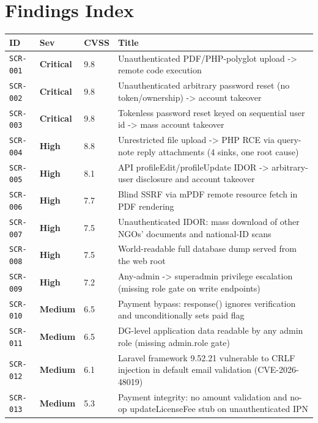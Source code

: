 \documentclass[11pt,a4paper]{article}
\newcommand{\sevbadge}[1]{\textbf{\textcolor{sev#1}{#1}}}
\begin{document}
\section*{Findings Index}
{\renewcommand{\arraystretch}{1.25}%
\begin{longtable}{@{}l l l >{\raggedright\arraybackslash}p{}@{}}
\toprule \textbf{ID} & \textbf{Sev} & \textbf{CVSS} & \textbf{Title}\\\midrule\endhead
\texttt{SCR-001} & \sevbadge{Critical} & 9.8 & Unauthenticated PDF/PHP-polyglot upload -\textgreater{} remote code execution\\
\texttt{SCR-002} & \sevbadge{Critical} & 9.8 & Unauthenticated arbitrary password reset (no token/ownership) -\textgreater{} account takeover\\
\texttt{SCR-003} & \sevbadge{Critical} & 9.8 & Tokenless password reset keyed on sequential user id -\textgreater{} mass account takeover\\
\texttt{SCR-004} & \sevbadge{High} & 8.8 & Unrestricted file upload -\textgreater{} PHP RCE via query-note reply attachments (4 sinks, one root cause)\\
\texttt{SCR-005} & \sevbadge{High} & 8.1 & API profileEdit/profileUpdate IDOR -\textgreater{} arbitrary-user disclosure and account takeover\\
\texttt{SCR-006} & \sevbadge{High} & 7.7 & Blind SSRF via mPDF remote resource fetch in PDF rendering\\
\texttt{SCR-007} & \sevbadge{High} & 7.5 & Unauthenticated IDOR: mass download of other NGOs' documents and national-ID scans\\
\texttt{SCR-008} & \sevbadge{High} & 7.5 & World-readable full database dump served from the web root\\
\texttt{SCR-009} & \sevbadge{High} & 7.2 & Any-admin -\textgreater{} superadmin privilege escalation (missing role gate on write endpoints)\\
\texttt{SCR-010} & \sevbadge{Medium} & 6.5 & Payment bypass: response() ignores verification and unconditionally sets paid flag\\
\texttt{SCR-011} & \sevbadge{Medium} & 6.5 & DG-level application data readable by any admin role (missing admin.role gate)\\
\texttt{SCR-012} & \sevbadge{Medium} & 6.1 & Laravel framework 9.52.21 vulnerable to CRLF injection in default email validation (CVE-2026-48019)\\
\texttt{SCR-013} & \sevbadge{Medium} & 5.3 & Payment integrity: no amount validation and no-op updateLicenseFee stub on unauthenticated IPN\\

\end{longtable}}
\end{document}
